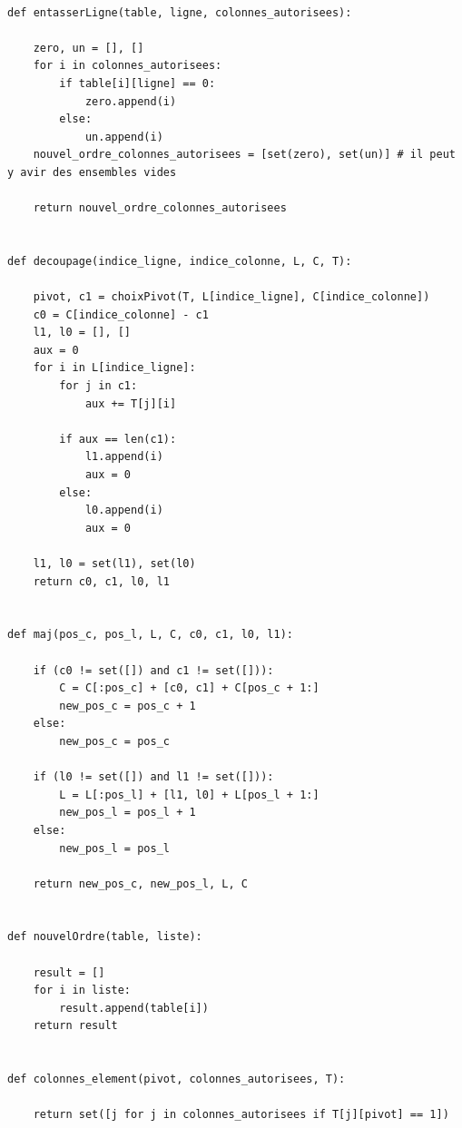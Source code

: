 \documentclass[a4paper]{report}
\begin{document}
\begin{lstlisting}
 
def entasserLigne(table, ligne, colonnes_autorisees):
   
    zero, un = [], []
    for i in colonnes_autorisees:
        if table[i][ligne] == 0:
            zero.append(i)
        else:
            un.append(i)
    nouvel_ordre_colonnes_autorisees = [set(zero), set(un)] # il peut y avir des ensembles vides
    
    return nouvel_ordre_colonnes_autorisees
 
 
def decoupage(indice_ligne, indice_colonne, L, C, T):
    
    pivot, c1 = choixPivot(T, L[indice_ligne], C[indice_colonne])
    c0 = C[indice_colonne] - c1
    l1, l0 = [], []
    aux = 0
    for i in L[indice_ligne]:
        for j in c1:
            aux += T[j][i]
          
        if aux == len(c1):
            l1.append(i)
            aux = 0
        else:
            l0.append(i)
            aux = 0
    
    l1, l0 = set(l1), set(l0)
    return c0, c1, l0, l1
  
 
def maj(pos_c, pos_l, L, C, c0, c1, l0, l1):
    
    if (c0 != set([]) and c1 != set([])):
        C = C[:pos_c] + [c0, c1] + C[pos_c + 1:]
        new_pos_c = pos_c + 1
    else:
        new_pos_c = pos_c
      
    if (l0 != set([]) and l1 != set([])):
        L = L[:pos_l] + [l1, l0] + L[pos_l + 1:]
        new_pos_l = pos_l + 1
    else:
        new_pos_l = pos_l
    
    return new_pos_c, new_pos_l, L, C


def nouvelOrdre(table, liste):
    
    result = []
    for i in liste:
        result.append(table[i])
    return result


def colonnes_element(pivot, colonnes_autorisees, T):
    
    return set([j for j in colonnes_autorisees if T[j][pivot] == 1])

\end{lstlisting}
\end{document}
